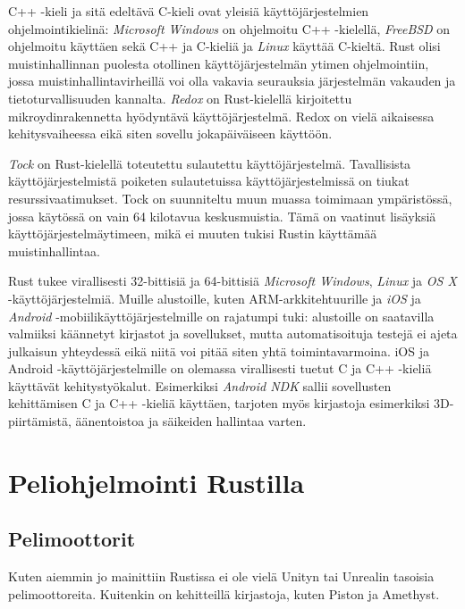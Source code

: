 \documentclass[finnish]{tktltiki2}
\theoremstyle{definition}
\theoremstyle{remark}
\begin{document}
C++ -kieli ja sitä edeltävä C-kieli ovat yleisiä käyttöjärjestelmien ohjelmointikielinä: \textit{Microsoft Windows} on ohjelmoitu C++ -kielellä, \textit{FreeBSD} on ohjelmoitu käyttäen sekä C++ ja C-kieliä ja \textit{Linux} käyttää C-kieltä. Rust olisi muistinhallinnan puolesta otollinen käyttöjärjestelmän ytimen ohjelmointiin, jossa muistinhallintavirheillä voi olla vakavia seurauksia järjestelmän vakauden ja tietoturvallisuuden kannalta. \textit{Redox} on Rust-kielellä kirjoitettu mikroydinrakennetta hyödyntävä käyttöjärjestelmä.\cite{WhatRedoxIs} Redox on vielä aikaisessa kehitysvaiheessa eikä siten sovellu jokapäiväiseen käyttöön.

\textit{Tock} on Rust-kielellä toteutettu sulautettu käyttöjärjestelmä.\cite{OwnershipIsTheft} Tavallisista käyttöjärjestelmistä poiketen sulautetuissa käyttöjärjestelmissä on tiukat resurssivaatimukset. Tock on suunniteltu muun muassa toimimaan ympäristössä, jossa käytössä on vain 64 kilotavua keskusmuistia. Tämä on vaatinut lisäyksiä käyttöjärjestelmäytimeen, mikä ei muuten tukisi Rustin käyttämää muistinhallintaa. %

Rust tukee virallisesti 32-bittisiä ja 64-bittisiä \textit{Microsoft Windows}, \textit{Linux} ja \textit{OS X} -käyttöjärjestelmiä.\cite{RustPlatformSupport} Muille alustoille, kuten ARM-arkkitehtuurille ja \textit{iOS} ja \textit{Android} -mobiilikäyttöjärjestelmille on rajatumpi tuki: alustoille on saatavilla valmiiksi käännetyt kirjastot ja sovellukset, mutta automatisoituja testejä ei ajeta julkaisun yhteydessä eikä niitä voi pitää siten yhtä toimintavarmoina. iOS ja Android -käyttöjärjestelmille on olemassa virallisesti tuetut C ja C++ -kieliä käyttävät kehitystyökalut. Esimerkiksi \textit{Android NDK} sallii sovellusten kehittämisen C ja C++ -kieliä käyttäen, tarjoten myös kirjastoja esimerkiksi 3D-piirtämistä, äänentoistoa ja säikeiden hallintaa varten.\cite{AndroidNDK}

\section{Peliohjelmointi Rustilla}

\subsection{Pelimoottorit}
Kuten aiemmin jo mainittiin Rustissa ei ole vielä Unityn tai Unrealin tasoisia pelimoottoreita. Kuitenkin on kehitteillä kirjastoja, kuten Piston ja Amethyst. 
\end{document}
